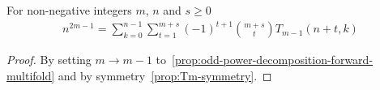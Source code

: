 \begin{proposition}
    \label{prop:odd-power-decomposition-forward-m-1-shifted-multifold}
    For non-negative integers $m$, $n$ and $s\geq 0$
    \begin{align*}
        n^{2m-1} = \sum_{k=0}^{n-1} \sum_{t=1}^{m+s} (-1)^{t+1} \binom{m+s}{t} T_{m-1} (n+t, k)
    \end{align*}
    \begin{proof}
        By setting $m \rightarrow m-1$ to~\eqref{prop:odd-power-decomposition-forward-multifold} and
        by symmetry~\eqref{prop:Tm-symmetry}.
    \end{proof}
\end{proposition}
